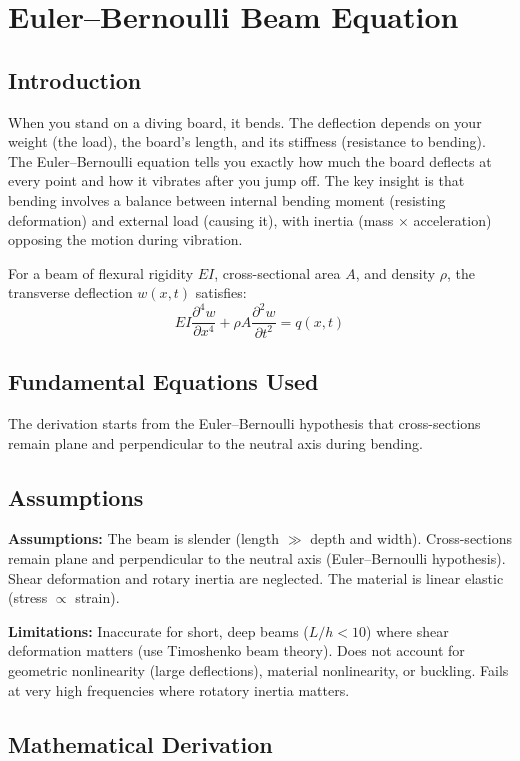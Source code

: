 \chapter{Euler--Bernoulli Beam Equation}

\section*{Introduction}

When you stand on a diving board, it bends. The deflection depends on your weight (the load), the board's length, and its stiffness (resistance to bending). The Euler--Bernoulli equation tells you exactly how much the board deflects at every point and how it vibrates after you jump off. The key insight is that bending involves a balance between internal bending moment (resisting deformation) and external load (causing it), with inertia (mass $\times$ acceleration) opposing the motion during vibration.


For a beam of flexural rigidity $EI$, cross-sectional area $A$, and density $\rho$, the transverse deflection $w(x,t)$ satisfies:
\[
EI\frac{\partial^4 w}{\partial x^4} + \rho A \frac{\partial^2 w}{\partial t^2} = q(x,t)
\]

\section*{Fundamental Equations Used}

The derivation starts from the Euler--Bernoulli hypothesis that cross-sections remain plane and perpendicular to the neutral axis during bending.

\section*{Assumptions}

\textbf{Assumptions:} The beam is slender (length $\gg$ depth and width). Cross-sections remain plane and perpendicular to the neutral axis (Euler--Bernoulli hypothesis). Shear deformation and rotary inertia are neglected. The material is linear elastic (stress $\propto$ strain).


\textbf{Limitations:} Inaccurate for short, deep beams ($L/h < 10$) where shear deformation matters (use Timoshenko beam theory). Does not account for geometric nonlinearity (large deflections), material nonlinearity, or buckling. Fails at very high frequencies where rotatory inertia matters.


\section*{Mathematical Derivation}

